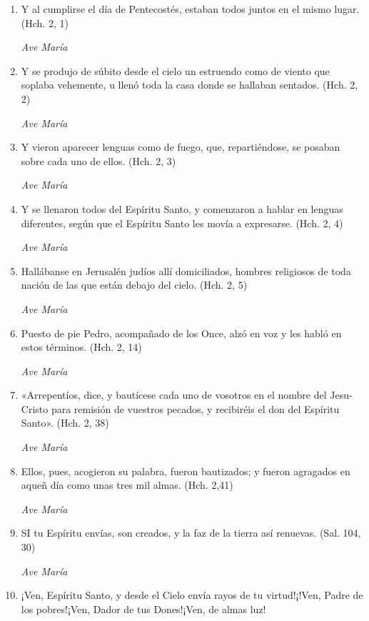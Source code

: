 \documentclass[a4paper,11pt, oneside]{report}
\begin{document}
        \begin{enumerate}

          \item Y al cumplirse el día de Pentecostés, estaban todos juntos en el mismo lugar. (Hch. 2, 1)

          \textit{Ave María}

          \item Y se produjo de súbito desde el cielo un estruendo como de viento que soplaba vehemente, u llenó toda la casa
          donde se hallaban sentados. (Hch. 2, 2)

          \textit{Ave María}

          \item Y vieron aparecer lenguas como de fuego, que, repartiéndose, se posaban sobre cada uno de ellos. (Hch. 2, 3)

          \textit{Ave María}

          \item Y se llenaron todos del Espíritu Santo, y comenzaron a hablar en lenguas diferentes, según que el Espíritu Santo les movía
          a expresarse. (Hch. 2, 4)

          \textit{Ave María}

          \item Hallábanse en Jerusalén judíos allí domiciliados, hombres religiosos de toda nación de las que están debajo del cielo. (Hch. 2, 5)

          \textit{Ave María}

          \item Puesto de pie Pedro, acompañado de los Once, alzó en voz y les habló en estos términos. (Hch. 2, 14)

          \textit{Ave María}

          \item «Arrepentíos, dice, y bautícese cada uno de vosotros en el nombre del Jesu-Cristo para remisión de vuestros pecados, y recibiréis el don
          del Espíritu Santo». (Hch. 2, 38)

          \textit{Ave María}

          \item Ellos, pues, acogieron su palabra, fueron bautizados; y fueron agragados en aqueñ día como unas tres mil almas. (Hch. 2,41)

          \textit{Ave María}

          \item SI tu Espíritu envías, son creados, y la faz de la tierra así renuevas. (Sal. 104, 30)

          \textit{Ave María}

          \item ¡Ven, Espíritu Santo, y desde el Cielo envía rayos de tu virtud!¡!Ven, Padre de los pobres!¡Ven, Dador de tus Dones!¡Ven, de almas luz!
          
        \end{enumerate}
\end{document}
